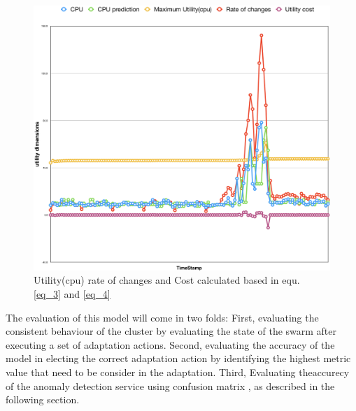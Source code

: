 \documentclass[graybox]{svmult}
\begin{document}
\begin{figure}[!ht] 
\centering
\includegraphics[scale=0.22]{changes}
\caption{Utility(cpu) rate of changes and Cost calculated based in equ. \ref{eq_3} and \ref{eq_4}}
\label{fig_changes}
\end{figure}

The evaluation of this model will come in two folds: First, evaluating the consistent behaviour of the cluster by evaluating the state of the swarm after executing a set of adaptation actions. Second, evaluating the accuracy of the model in electing the correct adaptation action by identifying the highest metric value that need to be consider in the adaptation. Third, Evaluating theaccurecy of the anomaly detection service using confusion matrix \cite{kohavi1998confusion},  as described in the following section. 
\end{document}
